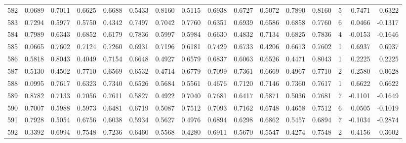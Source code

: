 \begin{tabular}{lrrrrrrrrrrrrrrr}
582 &      0.0689 &  0.7011 &  0.6625 &  0.6688 &  0.5433 &  0.8160 &  0.5115 &  0.6938 &  0.6727 &  0.5072 &   0.7890 &     0.8160 &      5 &                    0.7471 &                     0.6322 \\
583 &      0.7294 &  0.5977 &  0.5750 &  0.4342 &  0.7497 &  0.7042 &  0.7760 &  0.6351 &  0.6939 &  0.6586 &   0.6858 &     0.7760 &      6 &                    0.0466 &                    -0.1317 \\
584 &      0.7989 &  0.6343 &  0.6852 &  0.6179 &  0.7836 &  0.5997 &  0.5984 &  0.6630 &  0.4832 &  0.7134 &   0.6825 &     0.7836 &      4 &                   -0.0153 &                    -0.1646 \\
585 &      0.0665 &  0.7602 &  0.7124 &  0.7260 &  0.6931 &  0.7196 &  0.6181 &  0.7429 &  0.6733 &  0.4206 &   0.6613 &     0.7602 &      1 &                    0.6937 &                     0.6937 \\
586 &      0.5818 &  0.8043 &  0.4049 &  0.7154 &  0.6648 &  0.4927 &  0.6579 &  0.6837 &  0.6063 &  0.6526 &   0.4471 &     0.8043 &      1 &                    0.2225 &                     0.2225 \\
587 &      0.5130 &  0.4502 &  0.7710 &  0.6569 &  0.6532 &  0.4714 &  0.6779 &  0.7099 &  0.7361 &  0.6669 &   0.4967 &     0.7710 &      2 &                    0.2580 &                    -0.0628 \\
588 &      0.0995 &  0.7617 &  0.6323 &  0.7340 &  0.6526 &  0.5684 &  0.5561 &  0.4676 &  0.7120 &  0.7146 &   0.7360 &     0.7617 &      1 &                    0.6622 &                     0.6622 \\
589 &      0.8782 &  0.7133 &  0.7056 &  0.7611 &  0.5827 &  0.4922 &  0.7040 &  0.7681 &  0.6417 &  0.5871 &   0.5036 &     0.7681 &      7 &                   -0.1101 &                    -0.1649 \\
590 &      0.7007 &  0.5988 &  0.5973 &  0.6481 &  0.6719 &  0.5087 &  0.7512 &  0.7093 &  0.7162 &  0.6748 &   0.4658 &     0.7512 &      6 &                    0.0505 &                    -0.1019 \\
591 &      0.7928 &  0.5054 &  0.6756 &  0.6038 &  0.5934 &  0.5627 &  0.4976 &  0.6894 &  0.6298 &  0.6862 &   0.5457 &     0.6894 &      7 &                   -0.1034 &                    -0.2874 \\
592 &      0.3392 &  0.6994 &  0.7548 &  0.7236 &  0.6460 &  0.5568 &  0.4280 &  0.6911 &  0.5670 &  0.5547 &   0.4274 &     0.7548 &      2 &                    0.4156 &                     0.3602 \\

\end{tabular}
